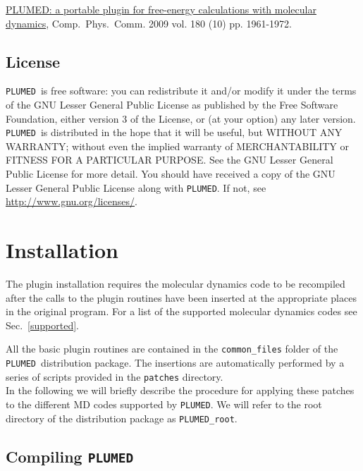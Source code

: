 \documentclass[12pt,fleqn]{report}
\newcommand{\plumed}{{\tt PLUMED}}
\begin{document}
\href{http://dx.doi.org/10.1016/j.cpc.2009.05.011}{PLUMED: a portable plugin for free-energy calculations with molecular dynamics},
 Comp.~Phys.~Comm. 2009 vol. 180 (10) pp. 1961-1972. 


\section{License}

\plumed \ is free software: you can redistribute it and/or modify 
it under the terms of the GNU Lesser General Public License as published by 
the Free Software Foundation, either version 3 of the License, or 
(at your option) any later version. 
\plumed \ is distributed in the hope that it will be useful,
but WITHOUT ANY WARRANTY; without even the implied warranty of
MERCHANTABILITY or FITNESS FOR A PARTICULAR PURPOSE.  See the 
GNU Lesser General Public License for more detail. 
You should have received a copy of the GNU Lesser General Public License
along with {\tt PLUMED}.  If not, see  \url{http://www.gnu.org/licenses/}.


\chapter{Installation}
\label{sec.install}
The plugin  installation requires the molecular
dynamics code to be recompiled after the calls to the plugin routines 
have been inserted at the appropriate places in the original program.  
For a list of the supported molecular dynamics codes see Sec.~\ref{supported}.

All the basic plugin routines are contained in the {\tt common\_files} folder of
the \plumed \ distribution package.
The insertions are automatically performed by a series of
scripts provided in the {\tt patches} directory.
\\
In the following we will briefly describe the procedure for applying these patches
to the different MD codes supported by \plumed.
We will refer to the root directory of the distribution package as {\tt PLUMED\_root}.

\section{Compiling \plumed}
\end{document}
